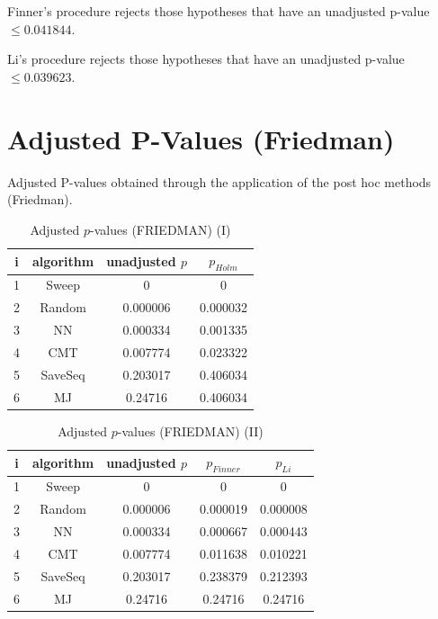 \documentclass[a4paper,10pt]{article}
\begin{document}
\begin{landscape}
Finner's procedure rejects those hypotheses that have an unadjusted p-value $\le0.041844$.

Li's procedure rejects those hypotheses that have an unadjusted p-value $\le0.039623$.


\newpage

\section{Adjusted P-Values (Friedman)}


Adjusted P-values obtained through the application of the post hoc methods (Friedman).

\begin{table}[!htp]
\centering\small
\begin{tabular}{cccc}
i&algorithm&unadjusted $p$&$p_{Holm}$\\
\hline1&Sweep&0&0\\2&Random&0.000006&0.000032\\3&NN&0.000334&0.001335\\4&CMT&0.007774&0.023322\\5&SaveSeq&0.203017&0.406034\\6&MJ&0.24716&0.406034\\\hline
\end{tabular}
\caption{Adjusted $p$-values (FRIEDMAN) (I)}
\end{table}
\begin{table}[!htp]
\centering\small
\begin{tabular}{ccccc}
i&algorithm&unadjusted $p$&$p_{Finner}$&$p_{Li}$\\
\hline1&Sweep&0&0&0\\2&Random&0.000006&0.000019&0.000008\\3&NN&0.000334&0.000667&0.000443\\4&CMT&0.007774&0.011638&0.010221\\5&SaveSeq&0.203017&0.238379&0.212393\\6&MJ&0.24716&0.24716&0.24716\\\hline
\end{tabular}
\caption{Adjusted $p$-values (FRIEDMAN) (II)}
\end{table}

\newpage
\end{landscape}
\end{document}
